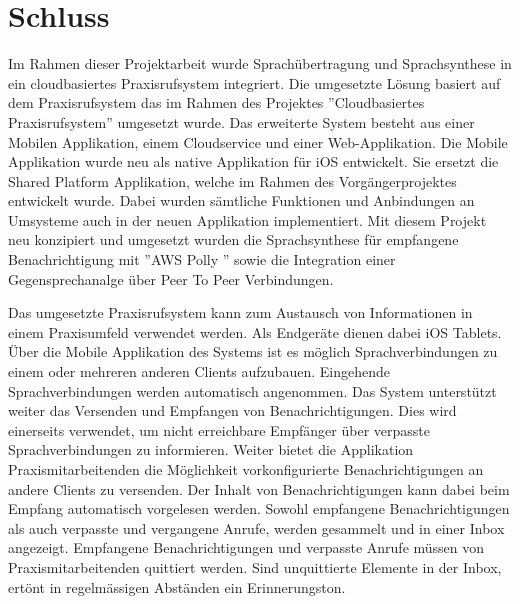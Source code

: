 \section{Schluss}

Im Rahmen dieser Projektarbeit wurde Sprachübertragung und Sprachsynthese in ein cloudbasiertes Praxisrufsystem integriert.
Die umgesetzte Lösung basiert auf dem Praxisrufsystem das im Rahmen des Projektes ''Cloudbasiertes Praxisrufsystem'' umgesetzt wurde.\cite{ip5}
Das erweiterte System besteht aus einer Mobilen Applikation, einem Cloudservice und einer Web-Applikation.
Die Mobile Applikation wurde neu als native Applikation für iOS entwickelt.
Sie ersetzt die Shared Platform Applikation, welche im Rahmen des Vorgängerprojektes entwickelt wurde.
Dabei wurden sämtliche Funktionen und Anbindungen an Umsysteme auch in der neuen Applikation implementiert.
Mit diesem Projekt neu konzipiert und umgesetzt wurden die Sprachsynthese für empfangene Benachrichtigung mit ''AWS Polly '' sowie die Integration einer Gegensprechanalge über Peer To Peer Verbindungen.

Das umgesetzte Praxisrufsystem kann zum Austausch von Informationen in einem Praxisumfeld verwendet werden.
Als Endgeräte dienen dabei iOS Tablets.
Über die Mobile Applikation des Systems ist es möglich Sprachverbindungen zu einem oder mehreren anderen Clients aufzubauen.
Eingehende Sprachverbindungen werden automatisch angenommen.
Das System unterstützt weiter das Versenden und Empfangen von Benachrichtigungen.
Dies wird einerseits verwendet, um nicht erreichbare Empfänger über verpasste Sprachverbindungen zu informieren.
Weiter bietet die Applikation Praxismitarbeitenden die Möglichkeit vorkonfigurierte Benachrichtigungen an andere Clients zu versenden.
Der Inhalt von Benachrichtigungen kann dabei beim Empfang automatisch vorgelesen werden.
Sowohl empfangene Benachrichtigungen als auch verpasste und vergangene Anrufe, werden gesammelt und in einer Inbox angezeigt.
Empfangene Benachrichtigungen und verpasste Anrufe müssen von Praxismitarbeitenden quittiert werden.
Sind unquittierte Elemente in der Inbox, ertönt in regelmässigen Abständen ein Erinnerungston.

